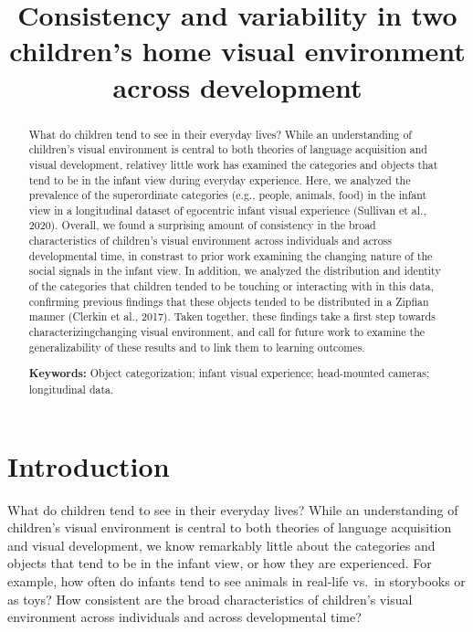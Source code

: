 \documentclass[10pt, letterpaper]{article}
\title{Consistency and variability in two children's home visual environment
across development}
\author{}
\begin{document}
\maketitle

\begin{abstract}
What do children tend to see in their everyday lives? While an
understanding of children's visual environment is central to both
theories of language acquisition and visual development, relativey
little work has examined the categories and objects that tend to be in
the infant view during everyday experience. Here, we analyzed the
prevalence of the superordinate categories (e.g., people, animals, food)
in the infant view in a longitudinal dataset of egocentric infant visual
experience (Sullivan et al., 2020). Overall, we found a surprising
amount of consistency in the broad characteristics of children's visual
environment across individuals and across developmental time, in
constrast to prior work examining the changing nature of the social
signals in the infant view. In addition, we analyzed the distribution
and identity of the categories that children tended to be touching or
interacting with in this data, confirming previous findings that these
objects tended to be distributed in a Zipfian manner (Clerkin et al.,
2017). Taken together, these findings take a first step towards
characterizingchanging visual environment, and call for future work to
examine the generalizability of these results and to link them to
learning outcomes.

\textbf{Keywords:}
Object categorization; infant visual experience; head-mounted cameras;
longitudinal data.
\end{abstract}

\hypertarget{introduction}{%
\section{Introduction}\label{introduction}}

What do children tend to see in their everyday lives? While an
understanding of children's visual environment is central to both
theories of language acquisition and visual development, we know
remarkably little about the categories and objects that tend to be in
the infant view, or how they are experienced. For example, how often do
infants tend to see animals in real-life vs.~in storybooks or as toys?
How consistent are the broad characteristics of children's visual
environment across individuals and across developmental time?
\end{document}
